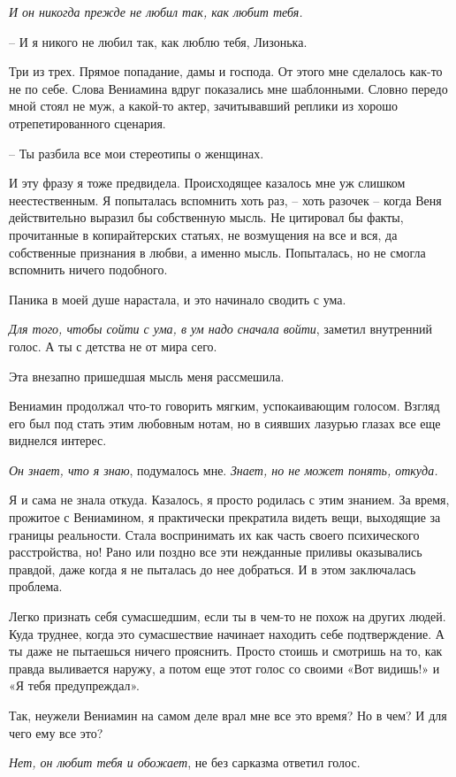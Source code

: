 \documentclass[
]{book}
\begin{document}
\emph{И он никогда прежде не любил так, как любит тебя.}

-- И я никого не любил так, как люблю тебя, Лизонька.

Три из трех. Прямое попадание, дамы и господа. От этого мне сделалось как-то не по себе. Слова Вениамина вдруг показались мне шаблонными. Словно передо мной стоял не муж, а какой-то актер, зачитывавший реплики из хорошо отрепетированного сценария.

-- Ты разбила все мои стереотипы о женщинах.

И эту фразу я тоже предвидела. Происходящее казалось мне уж слишком неестественным. Я попыталась вспомнить хоть раз, -- хоть разочек -- когда Веня действительно выразил бы собственную мысль. Не цитировал бы факты, прочитанные в копирайтерских статьях, не возмущения на все и вся, да собственные признания в любви, а именно мысль. Попыталась, но не смогла вспомнить ничего подобного.

Паника в моей душе нарастала, и это начинало сводить с ума.

\emph{Для того, чтобы сойти с ума, в ум надо сначала войти}, заметил внутренний голос. А ты с детства не от мира сего.

Эта внезапно пришедшая мысль меня рассмешила.

Вениамин продолжал что-то говорить мягким, успокаивающим голосом. Взгляд его был под стать этим любовным нотам, но в сиявших лазурью глазах все еще виднелся интерес.

\emph{Он знает, что я знаю}, подумалось мне. \emph{Знает, но не может понять, откуда.}

Я и сама не знала откуда. Казалось, я просто родилась с этим знанием. За время, прожитое с Вениамином, я практически прекратила видеть вещи, выходящие за границы реальности. Стала воспринимать их как часть своего психического расстройства, но! Рано или поздно все эти нежданные приливы оказывались правдой, даже когда я не пыталась до нее добраться. И в этом заключалась проблема.

Легко признать себя сумасшедшим, если ты в чем-то не похож на других людей. Куда труднее, когда это сумасшествие начинает находить себе подтверждение. А ты даже не пытаешься ничего прояснить. Просто стоишь и смотришь на то, как правда выливается наружу, а потом еще этот голос со своими «Вот видишь!» и «Я тебя предупреждал».

Так, неужели Вениамин на самом деле врал мне все это время? Но в чем? И для чего ему все это?

\emph{Нет, он любит тебя и обожает}, не без сарказма ответил голос.
\end{document}
